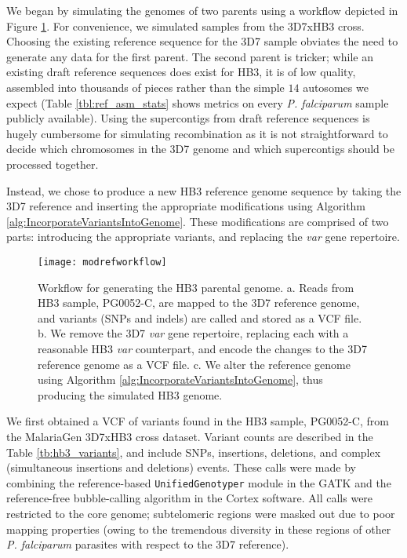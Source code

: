 We began by simulating the genomes of two parents using a workflow depicted in Figure \ref{fig:modrefworkflow}.  For convenience, we simulated samples from the 3D7xHB3 cross.  Choosing the existing reference sequence for the 3D7 sample obviates the need to generate any data for the first parent.  The second parent is tricker; while an existing draft reference sequences does exist for HB3, it is of low quality, assembled into thousands of pieces rather than the simple $14$ autosomes we expect (Table \ref{tbl:ref_asm_stats} shows metrics on every \textit{P. falciparum} sample publicly available).  Using the supercontigs from draft reference sequences is hugely cumbersome for simulating recombination as it is not straightforward to decide which chromosomes in the 3D7 genome and which supercontigs should be processed together.

Instead, we chose to produce a new HB3 reference genome sequence by taking the 3D7 reference and inserting the appropriate modifications using Algorithm \ref{alg:IncorporateVariantsIntoGenome}. These modifications are comprised of two parts: introducing the appropriate variants, and replacing the \textit{var} gene repertoire.

\begin{figure}[h!]
  \centering
    \texttt{[image: modrefworkflow]}
  \caption{Workflow for generating the HB3 parental genome.  a. Reads from HB3 sample, PG0052-C, are mapped to the 3D7 reference genome, and variants (SNPs and indels) are called and stored as a VCF file.  b. We remove the 3D7 \textit{var} gene repertoire, replacing each with a reasonable HB3 \textit{var} counterpart, and encode the changes to the 3D7 reference genome as a VCF file.  c. We alter the reference genome using Algorithm \ref{alg:IncorporateVariantsIntoGenome}, thus producing the simulated HB3 genome.}
  \label{fig:modrefworkflow}
\end{figure}

We first obtained a VCF of variants found in the HB3 sample, PG0052-C, from the MalariaGen 3D7xHB3 cross dataset\cite{Miles:2015in}.  Variant counts are described in the Table \ref{tb:hb3_variants}, and include SNPs, insertions, deletions, and complex (simultaneous insertions and deletions) events.  These calls were made by combining the reference-based \texttt{UnifiedGenotyper} module in the GATK\cite{DePristo:2011fo} and the reference-free bubble-calling algorithm in the Cortex\cite{Iqbal:2012fx} software.  All calls were restricted to the core genome; subtelomeric regions were masked out due to poor mapping properties (owing to the tremendous diversity in these regions of other \textit{P. falciparum} parasites with respect to the 3D7 reference).

